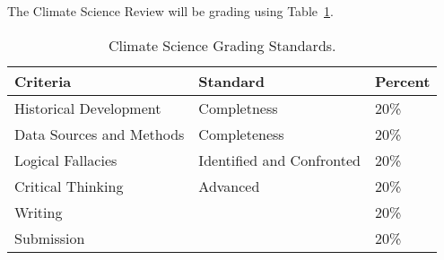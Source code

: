 The Climate Science Review will be grading using Table~\ref{tab:climatesciencegrading}. 

\begin{table}[h]
\caption{Climate Science Grading Standards.}
\label{tab:climatesciencegrading}
\begin{tabular}{lll}\hline
Criteria                & Standard      & Percent \\
\hline\hline
Historical Development  & Completness   & 20\% \\
Data Sources and Methods  & Completeness  & 20\% \\
Logical Fallacies & Identified and Confronted   & 20\% \\
Critical Thinking & Advanced                    & 20\%\\
Writing           && 20\% \\
Submission        && 20\% \\
\hline
\end{tabular}
\end{table}

